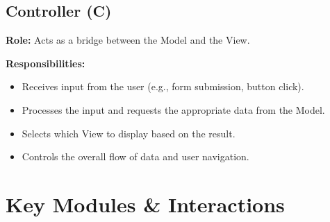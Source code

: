 \documentclass[12pt, a4paper]{report}
\begin{document}
\subsection{Controller (C)}

\textbf{Role:} Acts as a bridge between the Model and the View.

\textbf{Responsibilities:}
\begin{itemize}
    \item Receives input from the user (e.g., form submission, button click).
    \item Processes the input and requests the appropriate data from the Model.
    \item Selects which View to display based on the result.
    \item Controls the overall flow of data and user navigation.
\end{itemize}


\section{Key Modules \& Interactions}
\end{document}
